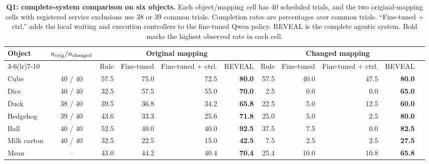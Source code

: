 \begin{table}[t]
\centering\scriptsize
\setlength{\tabcolsep}{3.5pt}
\begin{tabular*}{\textwidth}{@{\extracolsep{\fill}}lcrrrrrrrrr@{}}
\toprule
Object & $n_{\rm orig}/n_{\rm changed}$ & \multicolumn{4}{c}{Original mapping} & \multicolumn{4}{c}{Changed mapping}\\
\cmidrule(lr){3-6}\cmidrule(lr){7-10}
& & Rule & Fine-tuned & Fine-tuned + ctrl. & REVEAL & Rule & Fine-tuned & Fine-tuned + ctrl. & REVEAL\\
\midrule
Cube & 40 / 40 & 57.5 & 75.0 & 72.5 & \textbf{80.0} & 57.5 & 40.0 & 47.5 & \textbf{80.0}\\
Dice & 40 / 40 & 32.5 & 57.5 & 55.0 & \textbf{70.0} & 2.5 & 0.0 & 0.0 & \textbf{65.0}\\
Duck & 38 / 40 & 39.5 & 36.8 & 34.2 & \textbf{65.8} & 22.5 & 5.0 & 12.5 & \textbf{60.0}\\
Hedgehog & 39 / 40 & 43.6 & 33.3 & 25.6 & \textbf{71.8} & 25.0 & 5.0 & 2.5 & \textbf{80.0}\\
Ball & 40 / 40 & 52.5 & 40.0 & 40.0 & \textbf{92.5} & 37.5 & 7.5 & 0.0 & \textbf{82.5}\\
Milk carton & 40 / 40 & 32.5 & 22.5 & 15.0 & \textbf{42.5} & 7.5 & 2.5 & 2.5 & \textbf{27.5}\\
\midrule
Mean & -- & 43.0 & 44.2 & 40.4 & \textbf{70.4} & 25.4 & 10.0 & 10.8 & \textbf{65.8}\\
\bottomrule
\end{tabular*}
\caption{\textbf{Q1: complete-system comparison on six objects.} Each object/mapping cell has 40 scheduled trials, and the two original-mapping cells with registered service exclusions use 38 or 39 common trials. Completion rates are percentages over common trials. ``Fine-tuned + ctrl.'' adds the local waiting and execution controllers to the fine-tuned Qwen policy. REVEAL is the complete agentic system. Bold marks the highest observed rate in each cell.}
\label{tab:q1-all-objects}
\end{table}

